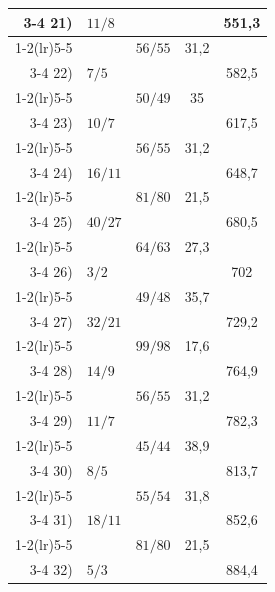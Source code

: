 {\begin{longtable}{r @{\;} l c c c}
  \cmidrule(lr){3-4}
  21) & $11/8$ &           &      & 551,3 \\
  \cmidrule(lr){1-2}\cmidrule(lr){5-5}
     &           & $56/55$ & 31,2 &       \\
  \cmidrule(lr){3-4}
  22) & $7/5$ &           &      & 582,5 \\
  \cmidrule(lr){1-2}\cmidrule(lr){5-5}
     &           & $50/49$ & 35 &       \\
  \cmidrule(lr){3-4}
  23) & $10/7$ &           &      & 617,5 \\
  \cmidrule(lr){1-2}\cmidrule(lr){5-5}
     &           & $56/55$ & 31,2 &       \\
  \cmidrule(lr){3-4}
  24) & $16/11$ &           &      & 648,7 \\
  \cmidrule(lr){1-2}\cmidrule(lr){5-5}
     &           & $81/80$ & 21,5 &       \\
  \cmidrule(lr){3-4}
  25) & $40/27$ &           &      & 680,5 \\
  \cmidrule(lr){1-2}\cmidrule(lr){5-5}
     &           & $64/63$ & 27,3 &       \\
  \cmidrule(lr){3-4}
  26) & $3/2$ &           &      & 702 \\
  \cmidrule(lr){1-2}\cmidrule(lr){5-5}
     &           & $49/48$ & 35,7 &       \\
  \cmidrule(lr){3-4}
  27) & $32/21$ &           &      & 729,2 \\
  \cmidrule(lr){1-2}\cmidrule(lr){5-5}
     &           & $99/98$ & 17,6 &       \\
  \cmidrule(lr){3-4}
  28) & $14/9$ &           &      & 764,9 \\
  \cmidrule(lr){1-2}\cmidrule(lr){5-5}
     &           & $56/55$ & 31,2 &       \\
  \cmidrule(lr){3-4}
  29) & $11/7$ &           &      & 782,3 \\
  \cmidrule(lr){1-2}\cmidrule(lr){5-5}
     &           & $45/44$ & 38,9 &       \\
  \cmidrule(lr){3-4}
  30) & $8/5$ &           &      & 813,7 \\
  \cmidrule(lr){1-2}\cmidrule(lr){5-5}
     &           & $55/54$ & 31,8 &       \\
  \cmidrule(lr){3-4}
  31) & $18/11$ &           &      & 852,6 \\
  \cmidrule(lr){1-2}\cmidrule(lr){5-5}
     &           & $81/80$ & 21,5 &       \\
  \cmidrule(lr){3-4}
  32) & $5/3$ &           &      & 884,4 \\

\end{longtable}}
